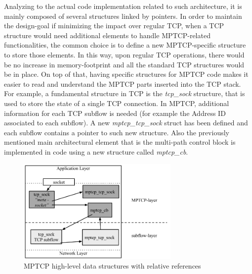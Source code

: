 Analyzing to the actual code implementation related to such architecture, it is mainly composed of several structures linked by pointers. In order to maintain the design-goal if minimizing the impact over regular TCP, when a TCP structure would need additional elements to handle MPTCP-related functionalities, the common choice is to define a new MPTCP-specific structure to store those elements. In this way, upon regular TCP operations, there would be no increase in memory-footprint and all the standard TCP structures would be in place. On top of that, having specific structures for MPTCP code makes it easier to read and understand the MPTCP parts inserted into the TCP stack. For example, a fundamental structure in TCP is the \textit{tcp\_sock} structure, that is used to store the state of a single TCP connection. In MPTCP, additional information for each TCP subflow is needed (for example the Address ID associated to each subflow). A new \textit{mptcp\_tcp\_sock} struct has been defined and each subflow contains a pointer to such new structure.
Also the previously mentioned main architectural element that is the multi-path control block is implemented in code using a new structure called \textit{mptcp\_cb}.

\begin{figure}[!htb]
\centering
\includegraphics[width=0.7\textwidth]{images/structs}
\caption{MPTCP high-level data structures with relative references}
\label{fig:structs}
\end{figure}

